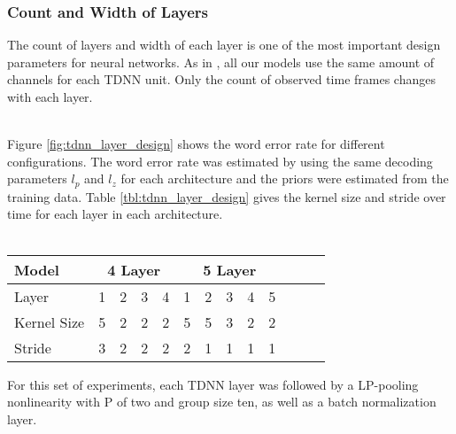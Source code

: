 \subsubsection{Count and Width of Layers}
The count of layers and width of each layer is one of the most important design parameters for neural networks. As in \cite{peddinti2015reverberation}, all our models use the same amount of channels for each TDNN unit. Only the count of observed time frames changes with each layer. \\ \\
\begin{minipage}{\linewidth}
	\label{fig:tdnn_layer_design}
\end{minipage}
Figure \ref{fig:tdnn_layer_design} shows the word error rate for different configurations. The word error rate was estimated by using the same decoding parameters $l_p$ and $l_z$ for each architecture and the priors were estimated from the training data. Table \ref{tbl:tdnn_layer_design} gives the kernel size and stride over time for each layer in each architecture. \\ \\
\begin{minipage}{\linewidth}
	\centering 
	\begin{tabular} {|l | c | c | c | c | c | c | c | c | c | c | c | c |}
	\hline
	Model & \multicolumn{4}{c|}{4 Layer} & \multicolumn{5}{c|}{5 Layer} \\
	\hline
	Layer & 1 & 2 & 3 & 4 & 1 & 2 & 3 & 4 & 5 \\
	\hline
	Kernel Size & 5 & 2 & 2 & 2 & 5 & 5 & 3 & 2 & 2 \\
	\hline
	Stride & 3 & 2 & 2 & 2 & 2 & 1 & 1 & 1 & 1 \\
	\hline
	\end{tabular}
	\label{tbl:tdnn_layer_design}
\end{minipage}
For this set of experiments, each TDNN layer was followed by a LP-pooling nonlinearity with P of two and group size ten, as well as a batch normalization layer. 
